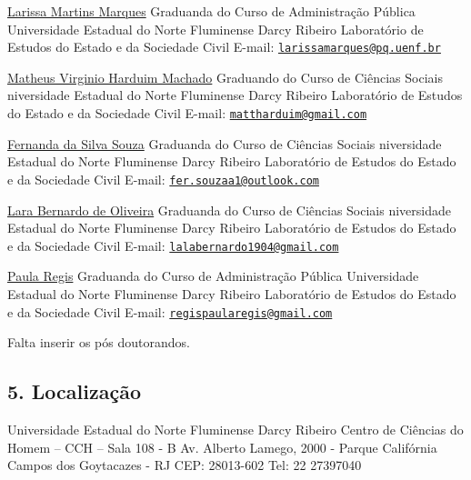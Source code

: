 \documentclass[
  12pt,
]{article}
\begin{document}
\href{http://lattes.cnpq.br/8424422005329610}{Larissa Martins Marques}
\hfill\break Graduanda do Curso de Administração Pública \hfill\break
Universidade Estadual do Norte Fluminense Darcy Ribeiro \hfill\break
Laboratório de Estudos do Estado e da Sociedade Civil \hfill\break
E-mail:
\href{mailto:larissamarques@pq.uenf.br}{\nolinkurl{larissamarques@pq.uenf.br}}
\hfill\break

\href{http://lattes.cnpq.br/6781198318316057}{Matheus Virginio Harduim
Machado} \hfill\break Graduando do Curso de Ciências Sociais
\hfill\break niversidade Estadual do Norte Fluminense Darcy Ribeiro
\hfill\break Laboratório de Estudos do Estado e da Sociedade Civil
\hfill\break E-mail:
\href{mailto:mattharduim@gmail.com}{\nolinkurl{mattharduim@gmail.com}}
\hfill\break

\href{http://lattes.cnpq.br/7181203038300743}{Fernanda da Silva Souza}
\hfill\break Graduanda do Curso de Ciências Sociais \hfill\break
niversidade Estadual do Norte Fluminense Darcy Ribeiro \hfill\break
Laboratório de Estudos do Estado e da Sociedade Civil \hfill\break
E-mail:
\href{mailto:fer.souzaa1@outlook.com}{\nolinkurl{fer.souzaa1@outlook.com}}
\hfill\break

\href{http://lattes.cnpq.br/6943283489647623}{Lara Bernardo de Oliveira}
\hfill\break Graduanda do Curso de Ciências Sociais \hfill\break 
niversidade Estadual do Norte Fluminense Darcy Ribeiro \hfill\break
Laboratório de Estudos do Estado e da Sociedade Civil \hfill\break
E-mail:
\href{mailto:lalabernardo1904@gmail.com}{\nolinkurl{lalabernardo1904@gmail.com}}
\hfill\break

\href{}{Paula Regis} \hfill\break Graduanda do Curso de Administração
Pública \hfill\break Universidade Estadual do Norte Fluminense Darcy
Ribeiro \hfill\break Laboratório de Estudos do Estado e da Sociedade
Civil \hfill\break E-mail:
\href{mailto:regispaularegis@gmail.com}{\nolinkurl{regispaularegis@gmail.com}}
\hfill\break

\hfill\break \hfill\break Falta inserir os pós doutorandos.
\hfill\break \hfill\break

\hypertarget{localizauxe7uxe3o}{%
\subsection{5. Localização}\label{localizauxe7uxe3o}}

\hfill\break \hfill\break Universidade Estadual do Norte Fluminense
Darcy Ribeiro \hfill\break Centro de Ciências do Homem -- CCH -- Sala
108 - B \hfill\break Av. Alberto Lamego, 2000 - Parque Califórnia
\hfill\break Campos dos Goytacazes - RJ \hfill\break CEP: 28013-602
\hfill\break Tel: 22 27397040 \hfill\break
\end{document}
